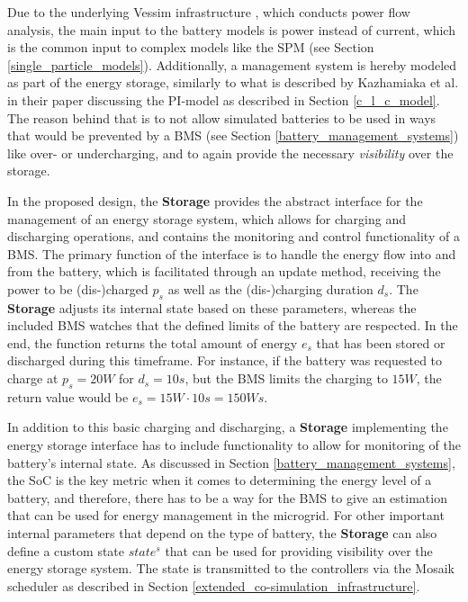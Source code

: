Due to the underlying Vessim infrastructure \cite{vessim}, which conducts power flow analysis, the main input to the battery models is power instead of current, which is the common input to complex models like the SPM (see Section \ref{single_particle_models}). Additionally, a management system is hereby modeled as part of the energy storage, similarly to what is described by Kazhamiaka et al. \cite{kazhamiaka2018pimodel} in their paper discussing the PI-model as described in Section \ref{c_l_c_model}. The reason behind that is to not allow simulated batteries to be used in ways that would be prevented by a BMS (see Section \ref{battery_management_systems}) like over- or undercharging, and to again provide the necessary \textit{visibility} over the storage.

In the proposed design, the \textbf{Storage} provides the abstract interface for the management of an energy storage system, which allows for charging and discharging operations, and contains the monitoring and control functionality of a BMS. The primary function of the interface is to handle the energy flow into and from the battery, which is facilitated through an update method, receiving the power to be (dis-)charged $p_s$ as well as the (dis-)charging duration $d_s$. The \textbf{Storage} adjusts its internal state based on these parameters, whereas the included BMS watches that the defined limits of the battery are respected. In the end, the function returns the total amount of energy $e_s$ that has been stored or discharged during this timeframe. For instance, if the battery was requested to charge at $p_s = 20W$ for $d_s = 10s$, but the BMS limits the charging to $15W$, the return value would be $e_s = 15W \cdot 10s = 150Ws$.

In addition to this basic charging and discharging, a \textbf{Storage} implementing the energy storage interface has to include functionality to allow for monitoring of the battery's internal state. As discussed in Section \ref{battery_management_systems}, the SoC is the key metric when it comes to determining the energy level of a battery, and therefore, there has to be a way for the BMS to give an estimation that can be used for energy management in the microgrid. For other important internal parameters that depend on the type of battery, the \textbf{Storage} can also define a custom state $state^{s}$ that can be used for providing visibility over the energy storage system. The state is transmitted to the controllers via the Mosaik scheduler as described in Section \ref{extended_co-simulation_infrastructure}.

